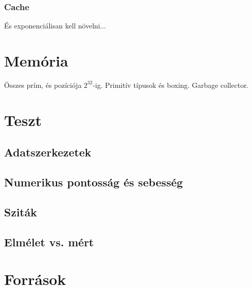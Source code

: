 \documentclass[12pt]{report}
\begin{document}
\subsubsection{Cache}

És exponenciálisan kell növelni...

\section{Memória}

Összes prím, és pozíciója $2^32$-ig. Primitív típusok és boxing. Garbage collector.

\section{Teszt}

\subsection{Adatszerkezetek}

\subsection{Numerikus pontosság és sebesség}

\subsection{Sziták}

\subsection{Elmélet vs. mért}

\section{Források}
\end{document}
